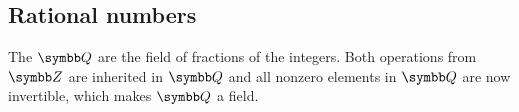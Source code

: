 \subsection{Rational numbers}\label{subsec:rational_numbers}

\begin{definition}\label{def:rational_numbers}
  The  \( \Q \) are the field of fractions of the integers. Both operations from \( \Z \) are inherited in \( \Q \) and all nonzero elements in \( \Q \) are now invertible, which makes \( \Q \) a field.
\end{definition}
